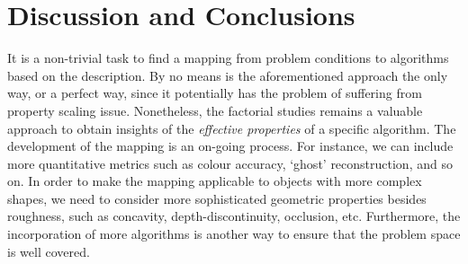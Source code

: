 \section{Discussion and Conclusions}
It is a non-trivial task to find a mapping from problem conditions to algorithms based on the description. By no means is the aforementioned approach the only way, or a perfect way, since it potentially has the problem of suffering from property scaling issue. Nonetheless, the factorial studies remains a valuable approach to obtain insights of the \textit{effective properties} of a specific algorithm. The development of the mapping is an on-going process. For instance, we can include more quantitative metrics such as colour accuracy, `ghost' reconstruction, and so on. In order to make the mapping applicable to objects with more complex shapes, we need to consider more sophisticated geometric properties besides roughness, such as concavity, depth-discontinuity, occlusion, etc. Furthermore, the incorporation of more algorithms is another way to ensure that the problem space is well covered.
